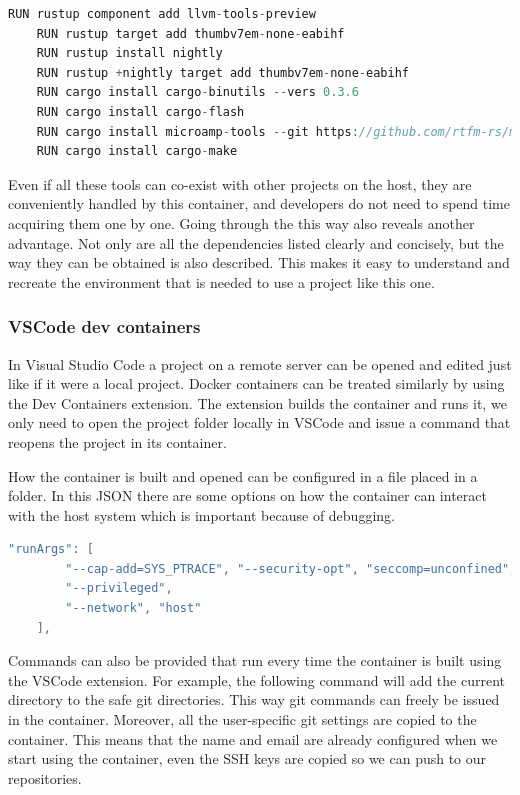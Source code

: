 \begin{lstlisting}[language=C,frame=single,float=!ht,label={lst:docker-cargo},caption={Installing Rust Specific Tools in the Container}]
    RUN rustup component add llvm-tools-preview
    RUN rustup target add thumbv7em-none-eabihf
    RUN rustup install nightly
    RUN rustup +nightly target add thumbv7em-none-eabihf
    RUN cargo install cargo-binutils --vers 0.3.6
    RUN cargo install cargo-flash
    RUN cargo install microamp-tools --git https://github.com/rtfm-rs/microamp
    RUN cargo install cargo-make
\end{lstlisting}

Even if all these tools can co-exist with other projects on the host, they are conveniently handled by this container, and developers do not need to spend time acquiring them one by one. Going through the  this way also reveals another advantage. Not only are all the dependencies listed clearly and concisely, but the way they can be obtained is also described. This makes it easy to understand and recreate the environment that is needed to use a project like this one.

\subsubsection{VSCode dev containers}

In Visual Studio Code a project on a remote server can be opened and edited just like if it were a local project. Docker containers can be treated similarly by using the Dev Containers extension. The extension builds the container and runs it, we only need to open the project folder locally in VSCode and issue a command that reopens the project in its container.

How the container is built and opened can be configured in a  file placed in a  folder. In this JSON there are some options on how the container can interact with the host system which is important because of debugging.

\begin{lstlisting}[language=C,frame=single,float=!ht,label={lst:devcont-args},caption={VSCode Devcontainer Arguments}]
    "runArgs": [
        "--cap-add=SYS_PTRACE", "--security-opt", "seccomp=unconfined",
        "--privileged",
        "--network", "host"
    ],
\end{lstlisting}

Commands can also be provided that run every time the container is built using the VSCode extension. For example, the following command will add the current directory to the safe git directories. This way git commands can freely be issued in the container. Moreover, all the user-specific git settings are copied to the container. This means that the name and email are already configured when we start using the container, even the SSH keys are copied so we can push to our repositories.

